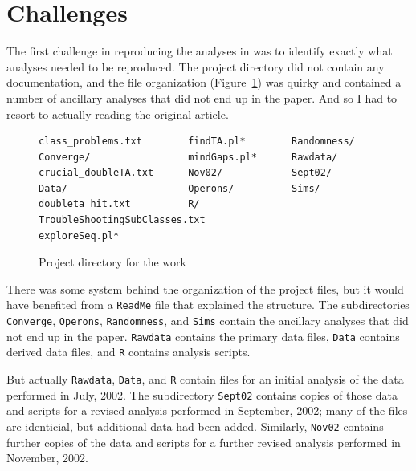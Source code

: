 \section{Challenges}

The first challenge in reproducing the analyses
in \citet{lamichhane2003} was to identify exactly what analyses needed
to be reproduced. The project directory did not contain any
documentation, and the file organization (Figure~\ref{fig:files}) was
quirky and contained a number of ancillary analyses that did not end
up in the paper. And so I had to resort to actually reading the
original article.



\begin{figure}

\begin{lstlisting}
class_problems.txt        findTA.pl*        Randomness/
Converge/                 mindGaps.pl*      Rawdata/
crucial_doubleTA.txt      Nov02/            Sept02/
Data/                     Operons/          Sims/
doubleta_hit.txt          R/                TroubleShootingSubClasses.txt
exploreSeq.pl*
\end{lstlisting}

\caption{Project directory for the work\label{fig:files}}
\end{figure}



There was some system behind the organization of the project files,
but it would have benefited from a {\tt ReadMe} file that
explained the structure. The
subdirectories {\tt Converge}, {\tt Operons}, {\tt Randomness},
and {\tt Sims} contain the ancillary analyses that did not end up in the
paper. {\tt Rawdata} contains the primary data files, {\tt Data}
contains derived data files, and {\tt R} contains analysis scripts.

But actually {\tt Rawdata}, {\tt Data}, and {\tt R} contain files
for an initial analysis of the data performed in July, 2002. The subdirectory
{\tt Sept02} contains copies of those data and scripts
for a revised analysis performed in September, 2002; many of the files
are identicial, but additional data had been added.
Similarly, {\tt Nov02} contains further copies of the data and
scripts for a further revised analysis performed in November, 2002.

